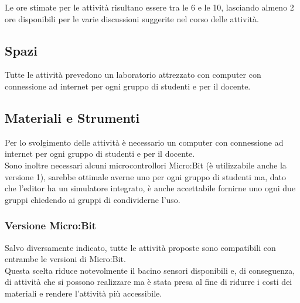 \documentclass[../../relazione.tex]{subfiles}
\begin{document}
Le ore stimate per le attività risultano essere tra le 6 e le 10, lasciando almeno 2 ore disponibili per le varie discussioni suggerite nel corso delle attività.

\subsection{Spazi}
Tutte le attività prevedono un laboratorio attrezzato con computer con connessione ad internet per ogni gruppo di studenti e per il docente. 

\subsection{Materiali e Strumenti}
Per lo svolgimento delle attività è necessario un computer con connessione ad internet per ogni gruppo di studenti e per il docente.\\
Sono inoltre necessari alcuni microcontrollori Micro:Bit (è utilizzabile anche la versione 1), sarebbe ottimale averne uno per ogni gruppo di studenti ma, dato che l'editor ha un simulatore integrato, è anche accettabile fornirne uno ogni due gruppi chiedendo ai gruppi di condividerne l'uso.

\subsubsection{Versione Micro:Bit}
Salvo diversamente indicato, tutte le attività proposte sono compatibili con entrambe le versioni di Micro:Bit.\\
Questa scelta riduce notevolmente il bacino sensori disponibili e, di conseguenza, di attività che si possono realizzare ma è stata presa al fine di ridurre i costi dei materiali e rendere l'attività più accessibile.
\end{document}
